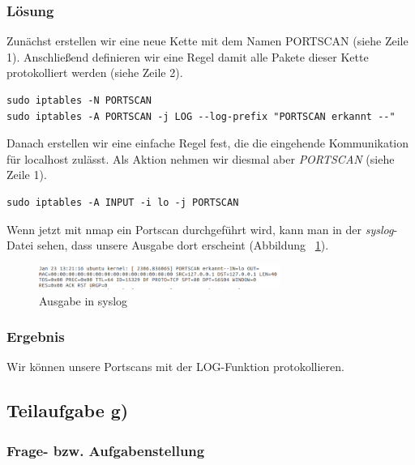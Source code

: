 \subsubsection{Lösung}

Zunächst erstellen wir eine neue Kette mit dem Namen PORTSCAN (siehe Zeile 1). Anschließend definieren wir eine Regel damit alle Pakete dieser Kette protokolliert werden (siehe Zeile 2).

\begin{lstlisting}[caption={Portscan protokollieren}]
sudo iptables -N PORTSCAN
sudo iptables -A PORTSCAN -j LOG --log-prefix "PORTSCAN erkannt --"
\end{lstlisting}

Danach erstellen wir eine einfache Regel fest, die die eingehende Kommunikation für localhost zulässt. Als Aktion nehmen wir diesmal aber \textit{PORTSCAN} (siehe Zeile 1).

\begin{lstlisting}[caption={Regel für PORTSCAN}]
sudo iptables -A INPUT -i lo -j PORTSCAN
\end{lstlisting}

Wenn jetzt mit nmap ein Portscan durchgeführt wird, kann man in der \textit{syslog}-Datei sehen, dass unsere Ausgabe dort erscheint (Abbildung ~\ref{fig:syslog}).

\begin{figure}[htbp]
\begin{center}
\includegraphics[width=0.7\textwidth]{Bild4}
\caption{Ausgabe in syslog}
\label{fig:syslog}
\end{center}
\end{figure}

\subsubsection{Ergebnis}

Wir können unsere Portscans mit der LOG-Funktion protokollieren.

\subsection{Teilaufgabe g)}

\subsubsection{Frage- bzw. Aufgabenstellung}

